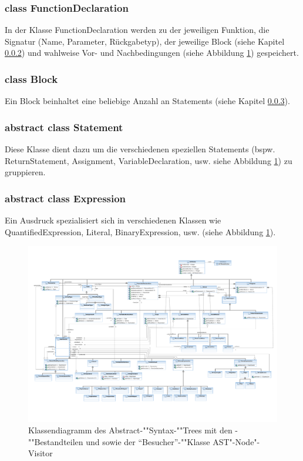 \subsubsection{class FunctionDeclaration}
\label{astfunctiondecl_class}
In der Klasse FunctionDeclaration werden zu der jeweiligen Funktion, die Signatur (Name, Parameter, Rückgabetyp), der jeweilige Block (siehe Kapitel \ref{astblock_class}) und wahlweise Vor- und Nachbedingungen (siehe Abbildung \ref{ast_diag}) gespeichert.

\subsubsection{class Block}
\label{astblock_class}
Ein Block beinhaltet eine beliebige Anzahl an Statements (siehe Kapitel \ref{aststatement_class}).

\subsubsection{abstract class Statement}
\label{aststatement_class}
Diese Klasse dient dazu um die verschiedenen speziellen Statements (bspw. ReturnStatement, Assignment, VariableDeclaration, usw. siehe Abbildung \ref{ast_diag}) zu gruppieren.

\subsubsection{abstract class Expression}
\label{astexpr_class}
Ein Ausdruck spezialisiert sich in verschiedenen Klassen wie QuantifiedExpression, Literal, BinaryExpression, usw. (siehe Abbildung \ref{ast_diag}).

\begin{landscape}
\begin{figure}%
    \vspace{-2cm}%
    \includegraphics[height=\textheight]{diagrams/ast_component.pdf}

    \caption{Klassendiagramm des Abstract-""Syntax-""Trees mit den
    -""Bestandteilen  und
     sowie der "`Besucher"'-""Klasse
    AST"-Node"-Visitor}

    \label{ast_diag}
\end{figure}%
\end{landscape}
